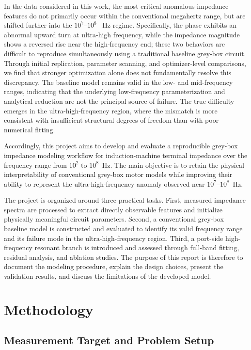 \documentclass[12pt,a4paper]{article}
\begin{document}
In the data considered in this work, the most critical anomalous impedance features do not primarily occur within the conventional megahertz range, but are shifted further into the $10^{7}$--$10^{8}$~ Hz regime. Specifically, the phase exhibits an abnormal upward turn at ultra-high frequency, while the impedance magnitude shows a reversed rise near the high-frequency end; these two behaviors are difficult to reproduce simultaneously using a traditional baseline grey-box circuit. Through initial replication, parameter scanning, and optimizer-level comparisons, we find that stronger optimization alone does not fundamentally resolve this discrepancy. The baseline model remains valid in the low- and mid-frequency ranges, indicating that the underlying low-frequency parameterization and analytical reduction are not the principal source of failure. The true difficulty emerges in the ultra-high-frequency region, where the mismatch is more consistent with insufficient structural degrees of freedom than with poor numerical fitting\cite{ref7,ref13,ref16,ref21,ref24,ref36,ref40}. 

Accordingly, this project aims to develop and evaluate a reproducible grey-box impedance modeling workflow for induction-machine terminal impedance over the frequency range from $10^2$ to $10^8$~Hz. The main objective is to retain the physical interpretability of conventional grey-box motor models while improving their ability to represent the ultra-high-frequency anomaly observed near $10^{7}$--$10^{8}$~Hz.

The project is organized around three practical tasks. First, measured impedance spectra are processed to extract directly observable features and initialize physically meaningful circuit parameters. Second, a conventional grey-box baseline model is constructed and evaluated to identify its valid frequency range and its failure mode in the ultra-high-frequency region. Third, a port-side high-frequency resonant branch is introduced and assessed through full-band fitting, residual analysis, and ablation studies. The purpose of this report is therefore to document the modeling procedure, explain the design choices, present the validation results, and discuss the limitations of the developed model.

\section{Methodology}

\subsection{Measurement Target and Problem Setup}
\end{document}
